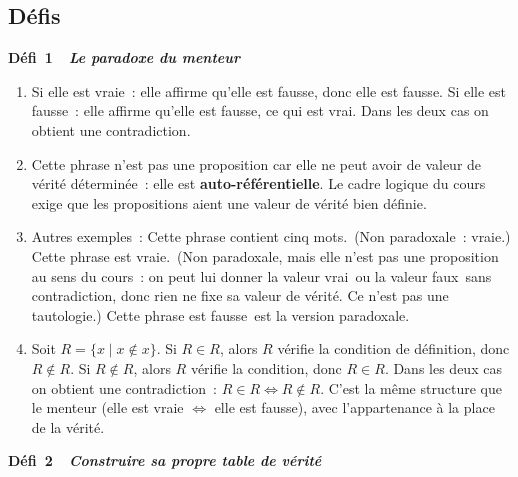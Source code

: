 \subsection*{D\'efis}

\noindent{}
{\color{BO}\bfseries\small D\'efi~1~\textendash\ \textit{Le paradoxe du menteur}}
\par\smallskip

\begin{enumerate}
  \item Si elle est vraie~: elle affirme qu'elle est fausse, donc elle est fausse.
        Si elle est fausse~: elle affirme qu'elle est fausse, ce qui est vrai.
        Dans les deux cas on obtient une contradiction.
  \item Cette phrase n'est pas une proposition car elle ne peut avoir de valeur de
        v\'erit\'e d\'etermin\'ee~: elle est \textbf{auto-r\'ef\'erentielle}.
        Le cadre logique du cours exige que les propositions aient une valeur de
        v\'erit\'e bien d\'efinie.
  \item Autres exemples~: \og Cette phrase contient cinq mots.\fg\
        (Non paradoxale~: vraie.) \og Cette phrase est vraie.\fg\
        (Non paradoxale, mais elle n'est pas une proposition au sens du cours~:
        on peut lui donner la valeur \og vrai\fg\ ou la valeur \og faux\fg\ sans contradiction,
        donc rien ne fixe sa valeur de v\'erit\'e. Ce n'est pas une tautologie.)
        \og Cette phrase est fausse\fg\ est la version paradoxale.
  \item Soit $R=\{x\mid x\notin x\}$. Si $R\in R$, alors $R$ v\'erifie la condition de
        d\'efinition, donc $R\notin R$. Si $R\notin R$, alors $R$ v\'erifie la condition,
        donc $R\in R$. Dans les deux cas on obtient une contradiction~:
        $R\in R\Leftrightarrow R\notin R$. C'est la m\^eme structure que le menteur
        (\og elle est vraie $\Leftrightarrow$ elle est fausse\fg), avec l'appartenance \`a la place de la v\'erit\'e.
\end{enumerate}

\noindent{}
{\color{BO}\bfseries\small D\'efi~2~\textendash\ \textit{Construire sa propre table de v\'erit\'e}}
\par\smallskip

